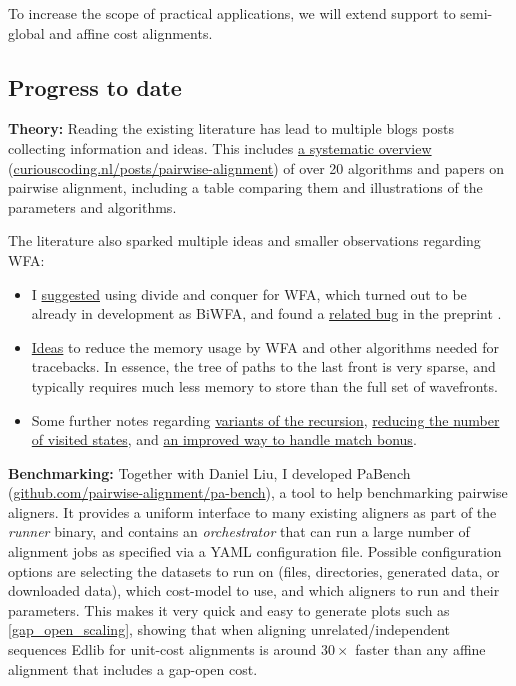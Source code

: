 \documentclass[11pt,english,a4paper]{article}
\begin{document}
To increase the scope of practical applications, we will extend support to
semi-global and affine cost alignments.

\subsection{Progress to date}
\label{sec:org24b2838}
\textbf{Theory:} Reading the existing literature has lead to multiple blogs posts collecting
information and ideas. This includes
\href{https://curiouscoding.nl/posts/pairwise-alignment/}{a systematic overview} (\href{https://curiouscoding.nl/posts/pairwise-alignment}{curiouscoding.nl/posts/pairwise-alignment}) of over 20 algorithms and papers on pairwise alignment,
including a table comparing them and illustrations of the parameters and algorithms.

The literature also sparked multiple ideas and smaller observations regarding WFA:
\begin{itemize}
\item I \href{https://github.com/smarco/WFA2-lib/issues/8}{suggested} using divide and conquer \autocite{hirschberg75} for WFA, which
turned out to be already in development as BiWFA, and found a \href{https://github.com/smarco/BiWFA-paper/issues/8}{related bug} in
the preprint \autocite{biwfa}.
\item \href{https://curiouscoding.nl/posts/linear-memory-wfa/}{Ideas} to reduce the memory usage by WFA and other algorithms needed for tracebacks.
In essence, the tree of paths to the last front is very sparse, and typically
requires much less memory to store than the full set of wavefronts.
\item Some further notes regarding \href{https://curiouscoding.nl/posts/wfa-variations/}{variants of the recursion}, \href{https://curiouscoding.nl/posts/diamond-optimization/}{reducing the number of
visited states}, and \href{https://curiouscoding.nl/posts/alignment-scores-transform/}{an improved way to handle match bonus}.
\end{itemize}

\textbf{Benchmarking:} Together with Daniel Liu, I developed PaBench
(\href{https://github.com/pairwise-alignment/pa-bench}{github.com/pairwise-alignment/pa-bench}), a tool to help benchmarking pairwise
aligners. It provides a uniform interface to many existing aligners as part of
the \emph{runner} binary, and contains an \emph{orchestrator} that can run a large number
of alignment jobs as specified via a YAML configuration file. Possible
configuration options are selecting the datasets to run on (files, directories,
generated data, or downloaded data), which cost-model to use, and which aligners
to run and their parameters. This makes it very quick and easy to generate plots
such as \ref{gap_open_scaling}, showing that when aligning unrelated/independent
sequences Edlib for unit-cost alignments is around \(30\times\) faster than any
affine alignment that includes a gap-open cost.
\end{document}
